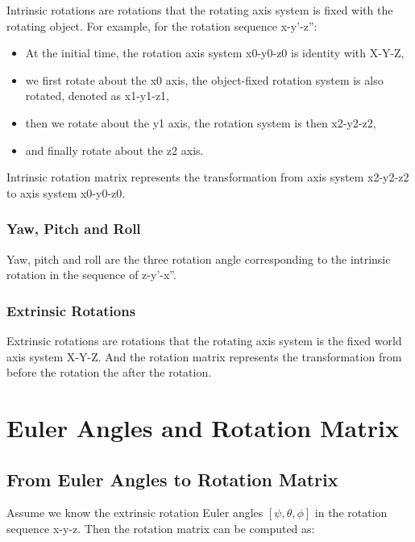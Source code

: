 \documentclass{article}
\begin{document}
Intrinsic rotations are rotations that the rotating axis system is fixed with the rotating object. For example, for the rotation sequence x-y'-z'':

\begin{itemize}
\item At the initial time, the rotation axis system x0-y0-z0 is identity with X-Y-Z, 
\item we first rotate about the x0 axis, the object-fixed rotation system is also rotated, denoted as x1-y1-z1,
\item then we rotate about the y1 axis, the rotation system is then x2-y2-z2,
\item and finally rotate about the z2 axis.
\end{itemize}

Intrinsic rotation matrix represents the transformation from axis system x2-y2-z2 to axis system x0-y0-z0.

\subsubsection*{Yaw, Pitch and Roll}

Yaw, pitch and roll are the three rotation angle corresponding to the intrinsic rotation in the sequence of z-y'-x''.

\subsubsection*{Extrinsic Rotations}

Extrinsic rotations are rotations that the rotating axis system is the fixed world axis system X-Y-Z. And the rotation matrix represents the transformation from before the rotation the after the rotation.

\section{Euler Angles and Rotation Matrix}

\subsection{From Euler Angles to Rotation Matrix}

Assume we know the extrinsic rotation Euler angles $[\psi, \theta, \phi]$ in the rotation sequence x-y-z. Then the rotation matrix can be computed as:
\end{document}
